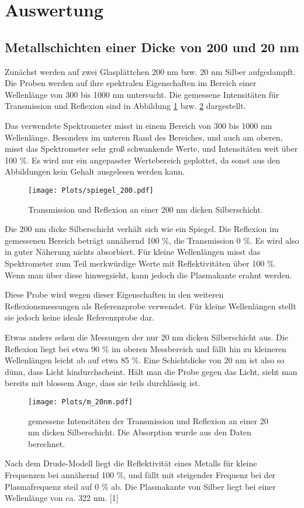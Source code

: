 \documentclass[10pt,twoside]{article}
\renewcommand{\1}{^{-1}}
\renewcommand{\2}{^{-2}}
\newcommand{\3}{^{-3}}
\newcommand{\4}{^{-4}}
\newcommand{\5}{^{-5}}
\newcommand{\6}{^{-6}}
\newcommand{\7}{^{-7}}
\newcommand{\8}{^{-8}}
\newcommand{\9}{^{-9}}
\begin{document}
\newpage

\section{Auswertung}

\subsection{Metallschichten einer Dicke von 200 und 20 nm}

Zunächst werden auf zwei Glasplättchen 200 nm bzw. 20 nm Silber aufgedampft. Die Proben werden auf ihre spektralen Eigenschaften im Bereich einer Wellenlänge von 300 bis 1000 nm untersucht.
Die gemessene Intensitäten für Transmission und Reflexion sind in Abbildung \ref{fig:spiegel} bzw. \ref{fig:m_20nm} dargestellt.

Das verwendete Spektrometer misst in einem Bereich von 300 bis 1000 nm Wellenlänge. Besonders im unteren Rand des Bereiches, und auch am oberen, misst das Spektrometer sehr groß schwankende Werte, und Intensitäten weit über 100 \%.
Es wird nur ein angepasster Wertebereich geplottet, da sonst aus den Abbildungen kein Gehalt ausgelesen werden kann.
\begin{figure}[H]
\centering
\texttt{[image: Plots/spiegel\_200.pdf]} 
\caption{Transmission und Reflexion an einer 200 nm dicken Silberschicht.}
\label{fig:spiegel}
\end{figure}
Die 200 nm dicke Silberschicht verhält sich wie ein Spiegel. Die Reflexion im gemessenen Bereich beträgt annähernd 100 \%, die Transmission 0 \%. Es wird also in guter Näherung nichts absorbiert.
Für kleine Wellenlängen misst das Spektrometer zum Teil merkwürdige Werte mit Reflektivitäten über 100 \%. Wenn man über diese hinwegsieht, kann jedoch die Plasmakante erahnt werden.

Diese Probe wird wegen dieser Eigenschaften in den weiteren Reflexionsmessungen als Referenzprobe verwendet. Für kleine Wellenlängen stellt sie jedoch keine ideale Referenzprobe dar.

Etwas anders sehen die Messungen der nur 20 nm dicken Silberschicht aus.
Die Reflexion liegt bei etwa 90 \% im oberen Messbereich und fällt hin zu kleineren Wellenlängen leicht ab auf etwa 85 \%.
Eine Schichtdicke von 20 nm ist also so dünn, dass Licht hindurchscheint. Hält man die Probe gegen das Licht, sieht man bereits mit blossem Auge, dass sie teils durchlässig ist.
\begin{figure}[H]
\centering
\texttt{[image: Plots/m\_20nm.pdf]} 
\caption{gemessene Intensitäten der Transmission und Reflexion an einer 20 nm dicken Silberschicht. Die Absorption wurde aus den Daten berechnet.}
\label{fig:m_20nm}
\end{figure}
Nach dem Drude-Modell liegt die Reflektivität eines Metalls für kleine Frequenzen bei annähernd 100 \%, und fällt mit steigender Frequenz bei der Plasmafrequenz steil auf 0 \% ab. Die Plasmakante von Silber liegt bei einer Wellenlänge von ca. 322 nm. [1] 
\end{document}
